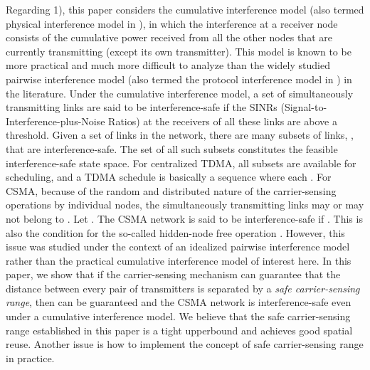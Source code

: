 \documentclass[conference]{IEEEtran}
\begin{document}
Regarding 1), this paper considers the cumulative interference model
(also termed physical interference model in \cite{prgupta}), in
which the interference at a receiver node  consists of the
cumulative power received from all the other nodes that are
currently transmitting (except its own transmitter). This model is
known to be more practical and much more diff\/icult to analyze than
the widely studied pairwise interference model (also termed the
protocol interference model in \cite{prgupta}) in the literature.
Under the cumulative interference model, a set of simultaneously
transmitting links are said to be interference-safe if the SINRs
(Signal-to-Interference-plus-Noise Ratios) at the receivers of all
these links are above a threshold. Given a set of links
 in the network, there are many subsets of links,
, that are interference-safe. The
set of all such subsets  constitutes the
feasible interference-safe state space. For centralized TDMA, all
subsets are available for scheduling, and a TDMA schedule is
basically a sequence  where each
. For CSMA, because of the random and
distributed nature of the carrier-sensing operations by individual
nodes, the simultaneously transmitting links  may
or may not belong to . Let
. The CSMA
network is said to be interference-safe if
. This is also the condition
for the so-called hidden-node free operation \cite{LiBin}. However,
this issue was studied under the context of an idealized pairwise
interference model \cite{LiBin} rather than the practical cumulative
interference model of interest here. In this paper, we show that if
the carrier-sensing mechanism can guarantee that the distance
between every pair of transmitters is separated by a \emph{safe
carrier-sensing range}, then 
can be guaranteed and the CSMA network is interference-safe even
under a cumulative interference model. We believe that the safe
carrier-sensing range established in this paper is a tight
upperbound and achieves good spatial reuse. Another issue is how to
implement the concept of safe carrier-sensing range in practice.
\end{document}
